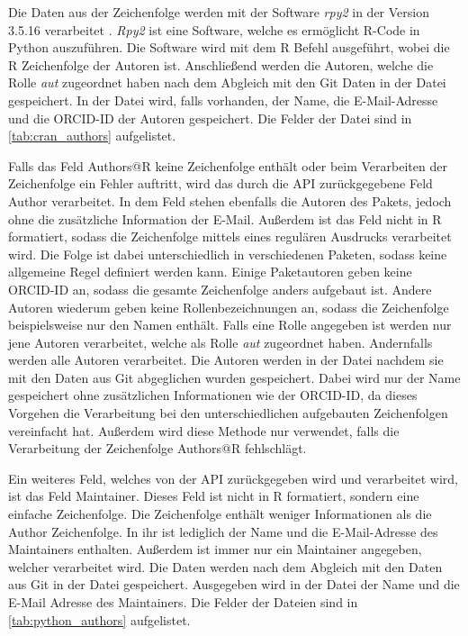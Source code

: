 Die Daten aus der Zeichenfolge werden mit der Software \emph{rpy2} in der Version 3.5.16 verarbeitet \autocite{noauthor_rpy2rpy2_2024}.
\emph{Rpy2} ist eine Software, welche es ermöglicht R-Code in Python auszuführen.
Die Software wird mit dem R Befehl  ausgeführt, wobei  die R Zeichenfolge der Autoren ist.
Anschließend werden die Autoren, welche die Rolle \emph{aut} zugeordnet haben nach dem Abgleich mit den Git Daten in der Datei  gespeichert.
In der Datei wird, falls vorhanden, der Name, die E-Mail-Adresse und die ORCID-ID der Autoren gespeichert.
Die Felder der Datei sind in \autoref{tab:cran_authors} aufgelistet.

Falls das Feld \glqq Authors@R\grqq{} keine Zeichenfolge enthält oder beim Verarbeiten der Zeichenfolge ein Fehler auftritt, wird das durch die API zurückgegebene Feld \glqq Author\grqq{} verarbeitet.
In dem Feld stehen ebenfalls die Autoren des Pakets, jedoch ohne die zusätzliche Information der E-Mail.
Außerdem ist das Feld nicht in R formatiert, sodass die Zeichenfolge mittels eines regulären Ausdrucks verarbeitet wird.
Die Folge ist dabei unterschiedlich in verschiedenen Paketen, sodass keine allgemeine Regel definiert werden kann.
Einige Paketautoren geben keine ORCID-ID an, sodass die gesamte Zeichenfolge anders aufgebaut ist.
Andere Autoren wiederum geben keine Rollenbezeichnungen an, sodass die Zeichenfolge beispielsweise nur den Namen enthält.
Falls eine Rolle angegeben ist werden nur jene Autoren verarbeitet, welche als Rolle \emph{aut} zugeordnet haben.
Andernfalls werden alle Autoren verarbeitet.
Die Autoren werden in der Datei  nachdem sie mit den Daten aus Git abgeglichen wurden gespeichert.
Dabei wird nur der Name gespeichert ohne zusätzlichen Informationen wie der ORCID-ID, da dieses Vorgehen die Verarbeitung bei den unterschiedlichen aufgebauten Zeichenfolgen vereinfacht hat.
Außerdem wird diese Methode nur verwendet, falls die Verarbeitung der Zeichenfolge \glqq Authors@R\grqq{} fehlschlägt.

Ein weiteres Feld, welches von der API zurückgegeben wird und verarbeitet wird, ist das Feld \glqq Maintainer\grqq{}.
Dieses Feld ist nicht in R formatiert, sondern eine einfache Zeichenfolge.
Die Zeichenfolge enthält weniger Informationen als die \glqq Author\grqq{} Zeichenfolge.
In ihr ist lediglich der Name und die E-Mail-Adresse des Maintainers enthalten.
Außerdem ist immer nur ein Maintainer angegeben, welcher verarbeitet wird.
Die Daten werden nach dem Abgleich mit den Daten aus Git in der Datei  gespeichert.
Ausgegeben wird in der Datei der Name und die E-Mail Adresse des Maintainers.
Die Felder der Dateien sind in \autoref{tab:python_authors} aufgelistet.

